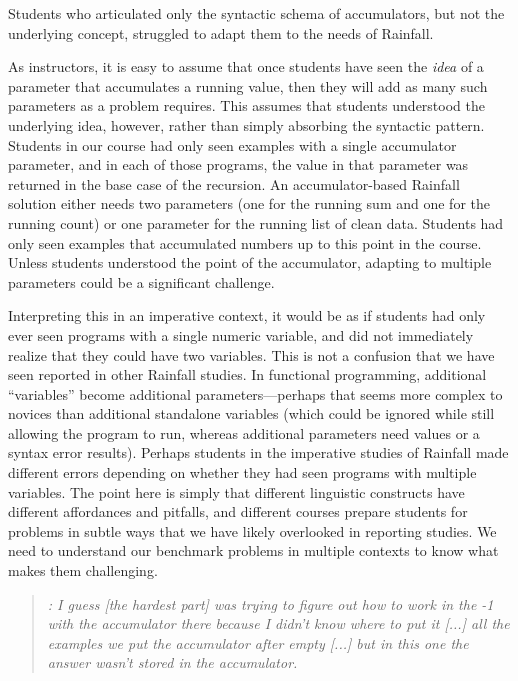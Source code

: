 
\begin{obs}
Students who articulated only the syntactic schema of accumulators,
but not the underlying concept, struggled to adapt them to the needs
of Rainfall.
\end{obs}

As instructors, it is easy to assume that once students have seen the
\emph{idea} of a parameter that accumulates a running value, then they
will add as many such parameters as a problem requires.  This assumes
that students understood the underlying idea, however, rather than
simply absorbing the syntactic pattern.
Students in
our course had only seen examples with a single accumulator parameter,
and in each of those programs, the value in that parameter was
returned in the base case of the recursion. An accumulator-based
Rainfall solution either needs two parameters (one for the running sum
and one for the running count) or one parameter for the running list
of clean data.  Students had only seen examples that accumulated
numbers up to this point in the course. Unless students understood the
point of the accumulator, adapting to multiple parameters could be a
significant challenge.

Interpreting this in an imperative context, it would be as if students
had only ever seen programs with a single numeric variable, and did
not immediately realize that they could have two variables. This is
not a confusion that we have seen reported in other Rainfall
studies. In functional programming, additional ``variables'' become
additional parameters---perhaps that seems more complex to novices
than additional standalone variables (which could be ignored while
still allowing the program to run, whereas additional parameters need
values or a syntax error results).  Perhaps students in the imperative
studies of Rainfall made different errors depending on whether they
had seen programs with multiple variables.  The point here is simply that
different linguistic constructs have different affordances and
pitfalls, and different courses prepare students for problems in
subtle ways that we have likely overlooked in reporting studies.
We need to understand our benchmark problems in multiple
contexts to know what makes them challenging.

\begin{quote}\it
\sthree: I guess [the hardest part] was trying to figure out how to work in the
  -1 with the accumulator there because I didn't know where to put it
  [...] all the examples we put the accumulator after empty [...]
  but in this one the answer wasn't stored in
  the accumulator.
\end{quote}

